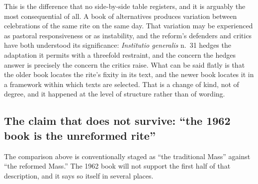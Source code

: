 This is the difference that no side-by-side table registers, and it is arguably the most consequential of all. A book of alternatives produces variation between celebrations of the same rite on the same day. That variation may be experienced as pastoral responsiveness or as instability, and the reform's defenders and critics have both understood its significance: \emph{Institutio generalis} n.~31 hedges the adaptation it permits with a threefold restraint, and the concern the hedges answer is precisely the concern the critics raise. What can be said flatly is that the older book locates the rite's fixity in its text, and the newer book locates it in a framework within which texts are selected. That is a change of kind, not of degree, and it happened at the level of structure rather than of wording.

\subsection{The claim that does not survive: ``the 1962 book is the unreformed rite''}

The comparison above is conventionally staged as ``the traditional Mass'' against ``the reformed Mass.'' The 1962 book will not support the first half of that description, and it says so itself in several places.

